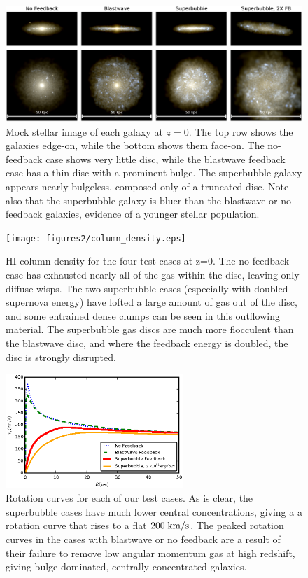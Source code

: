 \begin{figure}
    
    \includegraphics[width=\textwidth]{figures2/stellar_image.eps}
    \caption[Mock stellar image of galaxy at z=0 with different feedback
    models]{Mock stellar image of each galaxy at $z=0$.  The top row shows the
    galaxies edge-on, while the bottom shows them face-on.  The no-feedback case
    shows very little disc, while the blastwave feedback case has a thin disc
    with a prominent bulge.  The superbubble galaxy appears nearly bulgeless,
    composed only of a truncated disc. Note also that the superbubble galaxy is
    bluer than the blastwave or no-feedback galaxies, evidence of a younger
    stellar population.}
    \label{stellar_image2}
\end{figure}
\begin{figure}
    \texttt{[image: figures2/column\_density.eps]}
    \caption[HI column density in a galaxy at z=0 with different feedback models]{HI
    column density for the four test cases at z=0.  The no feedback case has
    exhausted nearly all of the gas within the disc, leaving only diffuse wisps.
    The two superbubble cases (especially with doubled supernova energy) have
    lofted a large amount of gas out of the disc, and some entrained dense
    clumps can be seen in this outflowing material.  The superbubble gas discs
    are much more flocculent than the blastwave disc, and where the feedback
    energy is doubled, the disc is strongly disrupted.}
    \label{column_density2}
\end{figure}
\begin{figure}
    \includegraphics[width=0.6\textwidth]{figures2/rotation_curve.eps}
    \caption[Rotation curves with different feedback models]{Rotation curves for
    each of our test cases.  As is clear, the superbubble cases have much lower
    central concentrations, giving a a rotation curve that rises to a flat
    $200\; \rm{km/s}$.  The peaked rotation curves in the cases with blastwave
    or no feedback are a result of their failure to remove low angular momentum
    gas at high redshift, giving bulge-dominated, centrally concentrated
    galaxies.}
    \label{rotation_curve2}
\end{figure}

